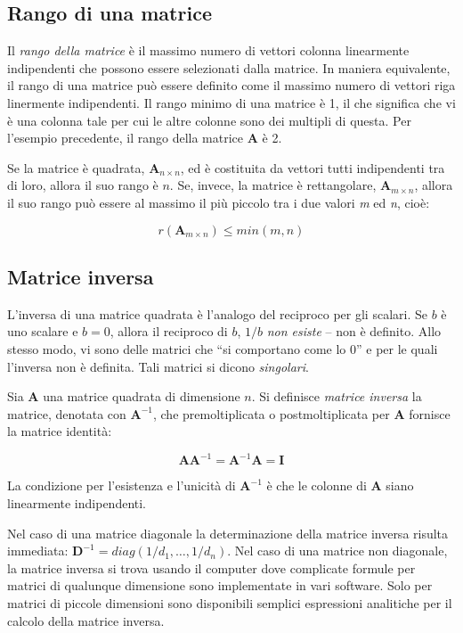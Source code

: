 \documentclass[
  11pt,
]{krantz}
\theoremstyle{definition}
\theoremstyle{definition}
\theoremstyle{definition}
\theoremstyle{definition}
\theoremstyle{remark}
\begin{document}
\hypertarget{rango-di-una-matrice}{%
\subsection{Rango di una matrice}\label{rango-di-una-matrice}}

Il \emph{rango della matrice} è il massimo numero di vettori colonna linearmente indipendenti che possono essere selezionati dalla matrice. In maniera equivalente, il rango di una matrice può essere definito come il massimo numero di vettori riga linermente indipendenti. Il rango minimo di una matrice è 1, il che significa che vi è una colonna tale per cui le altre colonne sono dei multipli di questa. Per l'esempio precedente, il rango della matrice \(\boldsymbol{A}\) è 2.

Se la matrice è quadrata, \(\boldsymbol{A}_{n \times n}\), ed è costituita da vettori tutti indipendenti tra di loro, allora il suo rango è \(n\). Se, invece, la matrice è rettangolare, \(\boldsymbol{A}_{m \times n}\), allora il suo rango può essere al massimo il più piccolo tra i due valori \emph{m} ed \emph{n}, cioè:

\[
r(\boldsymbol{A}_{m \times n}) \leq min(m,n)
\]

\hypertarget{matrice-inversa}{%
\subsection{Matrice inversa}\label{matrice-inversa}}

L'inversa di una matrice quadrata è l'analogo del reciproco per gli scalari. Se \(b\) è uno scalare e \(b=0\), allora il reciproco di \(b\), \(1/b\) \emph{non esiste} -- non è definito. Allo stesso modo, vi sono delle matrici che ``si comportano come lo 0'' e per le quali l'inversa non è definita. Tali matrici si dicono \emph{singolari}.

Sia \(\boldsymbol{A}\) una matrice quadrata di dimensione \(n\). Si definisce \emph{matrice inversa} la matrice, denotata con \(\boldsymbol{A}^{-1}\), che premoltiplicata o postmoltiplicata per \(\boldsymbol{A}\) fornisce la matrice identità:

\[
\boldsymbol{A}\boldsymbol{A}^{-1}=\boldsymbol{A}^{-1}\boldsymbol{A}=\boldsymbol{I}
\]

La condizione per l'esistenza e l'unicità di \(\boldsymbol{A}^{-1}\) è che le colonne di \(\boldsymbol{A}\) siano linearmente indipendenti.

Nel caso di una matrice diagonale la determinazione della matrice inversa risulta immediata: \(\boldsymbol{D}^{-1}= diag(1/d_1, \dots, 1/d_n)\). Nel caso di una matrice non diagonale, la matrice inversa si trova usando il computer dove complicate formule per matrici di qualunque dimensione sono implementate in vari software. Solo per matrici di piccole dimensioni sono disponibili semplici espressioni analitiche per il calcolo della matrice inversa.
\end{document}
